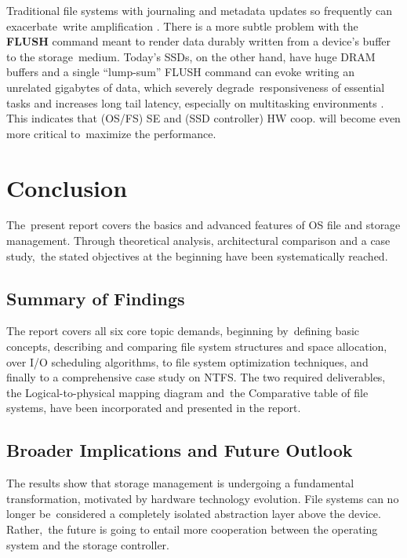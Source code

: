 \documentclass[12pt]{article}
\begin{document}
Traditional file systems with journaling and metadata updates so frequently can exacerbate write amplification \parencite{Lu2013Extending}. There is a more subtle problem with the \textbf{FLUSH} command meant to render data durably written from a device’s buffer to the storage medium. Today’s SSDs, on the other hand, have huge DRAM buffers and a single “lump-sum” FLUSH command can evoke writing an unrelated gigabytes of data, which severely degrade responsiveness of essential tasks and increases long tail latency, especially on multitasking environments \parencite{Yeon2018RFLUSH}. This indicates that (OS/FS) SE and (SSD controller) HW coop. will become even more critical to maximize the performance.


\section{Conclusion}
The present report covers the basics and advanced features of OS file and storage management. Through theoretical analysis, architectural comparison and a case study, the stated objectives at the beginning have been systematically reached. 

\subsection{Summary of Findings}
The report covers all six core topic demands, beginning by defining basic concepts, describing and comparing file system structures and space allocation, over I/O scheduling algorithms, to file system optimization techniques, and finally to a comprehensive case study on NTFS. The two required deliverables, the Logical-to-physical mapping diagram and the Comparative table of file systems, have been incorporated and presented in the report.

\subsection{Broader Implications and Future Outlook}
The results show that storage management is undergoing a fundamental transformation, motivated by hardware technology evolution. File systems can no longer be considered a completely isolated abstraction layer above the device. Rather, the future is going to entail more cooperation between the operating system and the storage controller.
\end{document}
